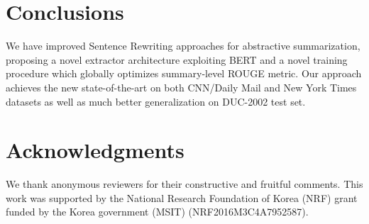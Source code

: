 \documentclass[11pt,a4paper]{article}
\begin{document}
\section{Conclusions}
We have improved Sentence Rewriting approaches for abstractive summarization,
proposing a novel extractor architecture exploiting BERT and a novel training
procedure which globally optimizes summary-level ROUGE metric.
Our approach achieves the new state-of-the-art on both CNN/Daily Mail and New York Times
datasets as well as much better generalization on DUC-2002 test set.

\section*{Acknowledgments}

We thank anonymous reviewers for their constructive and
fruitful comments.
This work was supported by the National
Research Foundation of Korea (NRF) grant funded by the
Korea government (MSIT) (NRF2016M3C4A7952587).
\end{document}
